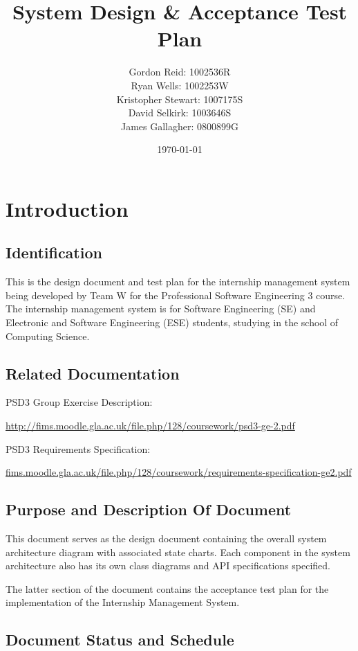 \documentclass[11pt]{l3deliverable}
\title{System Design \& Acceptance Test Plan}
\author{
    Gordon Reid: 1002536R\\
    Ryan Wells: 1002253W\\
    Kristopher Stewart: 1007175S\\
    David Selkirk: 1003646S\\
    James Gallagher: 0800899G\\
}
\date{\today}
\begin{document}
\maketitle

\newpage

\tableofcontents

\newpage

\section{Introduction}

\subsection{Identification}

This is the design document and test plan for the internship management system
being developed by Team W for the Professional Software Engineering 3 course.
The internship management system is for Software Engineering (SE) and Electronic
and Software Engineering (ESE) students, studying in the school of Computing
Science.

\subsection{Related Documentation}

PSD3 Group Exercise Description:

\url{http://fims.moodle.gla.ac.uk/file.php/128/coursework/psd3-ge-2.pdf}

PSD3 Requirements Specification:

\url{fims.moodle.gla.ac.uk/file.php/128/coursework/requirements-specification-ge2.pdf}

\subsection{Purpose and Description Of Document}

This document serves as the design document containing the overall system
architecture diagram with associated state charts. Each component in the
system architecture also has its own class diagrams and API specifications
specified.

The latter section of the document contains the acceptance test plan for
the implementation of the Internship Management System.

\subsection{Document Status and Schedule}
\end{document}
